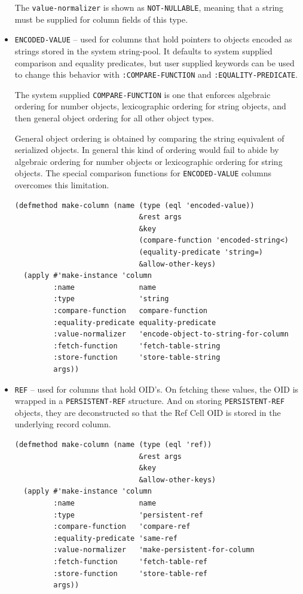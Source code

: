 \documentclass[article,oneside]{memoir}
\begin{document}
\begin{itemize}
The \texttt{value-normalizer} is shown as \texttt{NOT-NULLABLE}, meaning that a string must be supplied for column fields of this type.

\item \texttt{ENCODED-VALUE} -- used for columns that hold pointers to objects encoded as strings stored in the system string-pool. It defaults to system supplied comparison and equality predicates, but user supplied keywords can be used to change this behavior with \texttt{:COMPARE-FUNCTION} and \texttt{:EQUALITY-PREDICATE}.

The system supplied \texttt{COMPARE-FUNCTION} is one that enforces algebraic ordering for number objects, lexicographic ordering for string objects, and then general object ordering for all other object types. 

General object ordering is obtained by comparing the string equivalent of serialized objects. In general this kind of ordering would fail to abide by algebraic ordering for number objects or lexicographic ordering for string objects. The special comparison functions for \texttt{ENCODED-VALUE} columns overcomes this limitation.

\begin{verbatim}
(defmethod make-column (name (type (eql 'encoded-value))
                             &rest args
                             &key
                             (compare-function 'encoded-string<)
                             (equality-predicate 'string=)
                             &allow-other-keys)
  (apply #'make-instance 'column
         :name               name
         :type               'string
         :compare-function   compare-function
         :equality-predicate equality-predicate
         :value-normalizer   'encode-object-to-string-for-column
         :fetch-function     'fetch-table-string
         :store-function     'store-table-string
         args))
\end{verbatim}

\item \texttt{REF} -- used for columns that hold OID's. On fetching these values, the OID is wrapped in a \texttt{PERSISTENT-REF} structure. And on storing \texttt{PERSISTENT-REF} objects, they are deconstructed so that the Ref Cell OID is stored in the underlying record column.

\begin{verbatim}
(defmethod make-column (name (type (eql 'ref))
                             &rest args
                             &key
                             &allow-other-keys)
  (apply #'make-instance 'column
         :name               name
         :type               'persistent-ref
         :compare-function   'compare-ref
         :equality-predicate 'same-ref
         :value-normalizer   'make-persistent-for-column
         :fetch-function     'fetch-table-ref
         :store-function     'store-table-ref
         args))
\end{verbatim}


\end{itemize}
\end{document}
